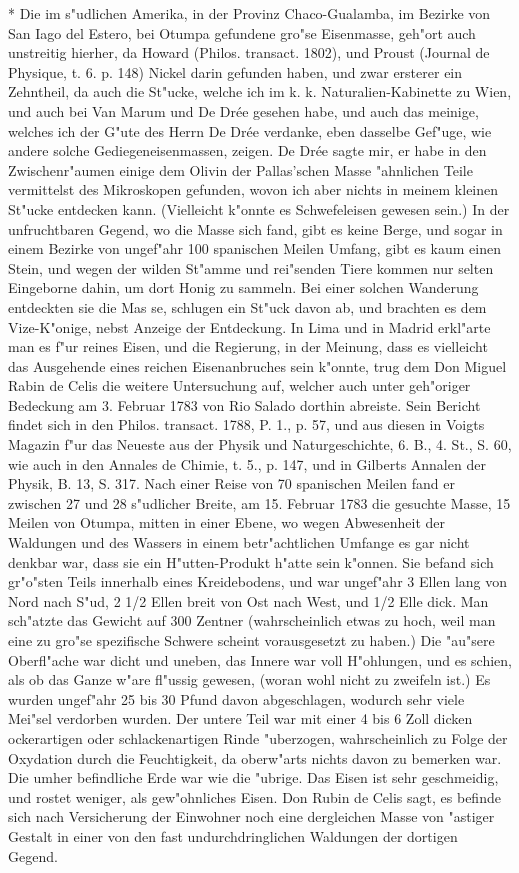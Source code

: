 \documentclass[a4paper, 11pt, oneside, polutonikogreek, german]{article}
\begin{document}
* Die im s"udlichen Amerika, in der Provinz Chaco-Gualamba, im Bezirke von San Iago del Estero, bei Otumpa gefundene gro"se Eisenmasse, geh"ort auch unstreitig hierher, da Howard (Philos. transact. 1802), und Proust (Journal de Physique, t. 6. p. 148) Nickel darin gefunden haben, und zwar ersterer ein Zehntheil, da auch die St"ucke, welche ich im k. k. Naturalien-Kabinette zu Wien, und auch bei Van Marum und De Drée gesehen habe, und auch das meinige, welches ich der G"ute des Herrn De Drée verdanke, eben dasselbe Gef"uge, wie andere solche Gediegeneisenmassen, zeigen. De Drée sagte mir, er habe in den Zwischenr"aumen einige dem Olivin der Pallas'schen Masse "ahnlichen Teile vermittelst des Mikroskopen gefunden, wovon ich aber nichts in meinem kleinen St"ucke entdecken kann. (Vielleicht k"onnte es Schwefeleisen gewesen sein.) In der unfruchtbaren Gegend, wo die Masse sich fand, gibt es keine Berge, und sogar in einem Bezirke von ungef"ahr 100 spanischen Meilen Umfang, gibt es kaum einen Stein, und wegen der wilden St"amme und rei"senden Tiere kommen nur selten Eingeborne dahin, um dort Honig zu sammeln. Bei einer solchen Wanderung entdeckten sie die Mas se, schlugen ein St"uck davon ab, und brachten es dem Vize-K"onige, nebst Anzeige der Entdeckung. In Lima und in Madrid erkl"arte man es f"ur reines Eisen, und die Regierung, in der Meinung, dass es vielleicht das Ausgehende eines reichen Eisenanbruches sein k"onnte, trug dem Don Miguel Rabin de Celis die weitere Untersuchung auf, welcher auch unter geh"origer Bedeckung am 3. Februar 1783 von Rio Salado dorthin abreiste. Sein Bericht findet sich in den Philos. transact. 1788, P. 1., p. 57, und aus diesen in Voigts Magazin f"ur das Neueste aus der Physik und Naturgeschichte, 6. B., 4. St., S. 60, wie auch in den Annales de Chimie, t. 5., p. 147, und in Gilberts Annalen der Physik, B. 13, S. 317. Nach einer Reise von 70 spanischen Meilen fand er zwischen 27 und 28 s"udlicher Breite, am 15. Februar 1783 die gesuchte Masse, 15 Meilen von Otumpa, mitten in einer Ebene, wo wegen Abwesenheit der Waldungen und des Wassers in einem betr"achtlichen Umfange es gar nicht denkbar war, dass sie ein H"utten-Produkt h"atte sein k"onnen. Sie befand sich gr"o"sten Teils innerhalb eines Kreidebodens, und war ungef"ahr 3 Ellen lang von Nord nach S"ud, 2 1/2 Ellen breit von Ost nach West, und 1/2 Elle dick. Man sch"atzte das Gewicht auf 300 Zentner (wahrscheinlich etwas zu hoch, weil man eine zu gro"se spezifische Schwere scheint vorausgesetzt zu haben.) Die "au"sere Oberfl"ache war dicht und uneben, das Innere war voll H"ohlungen, und es schien, als ob das Ganze w"are fl"ussig gewesen, (woran wohl nicht zu zweifeln ist.) Es wurden ungef"ahr 25 bis 30 Pfund davon abgeschlagen, wodurch sehr viele Mei"sel verdorben wurden. Der untere Teil war mit einer 4 bis 6 Zoll dicken ockerartigen oder schlackenartigen Rinde "uberzogen, wahrscheinlich zu Folge der Oxydation durch die Feuchtigkeit, da oberw"arts nichts davon zu bemerken war. Die umher befindliche Erde war wie die "ubrige. Das Eisen ist sehr geschmeidig, und rostet weniger, als gew"ohnliches Eisen. Don Rubin de Celis sagt, es befinde sich nach Versicherung der Einwohner noch eine dergleichen Masse von "astiger Gestalt in einer von den fast undurchdringlichen Waldungen der dortigen Gegend. 
\end{document}
